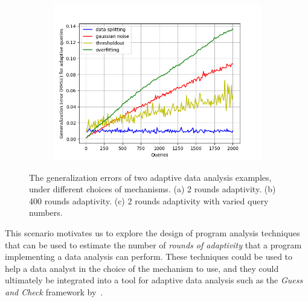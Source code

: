 {\begin{figure}
\begin{subfigure}{.322\textwidth}
\begin{centering}
\caption{}
\end{centering}
\end{subfigure}
\begin{subfigure}{.322\textwidth}
\begin{centering}
\includegraphics[width=1.0\textwidth]{twoRounds-rmse-fourmechs.png}
\caption{}
\end{centering}
\end{subfigure}
\vspace{-0.2cm}
 \caption{
 The generalization errors of two adaptive data analysis examples, under different choices of mechanisms.
 (a)  2 rounds adaptivity. 
 (b)  400 rounds adaptivity.
 (c) 2 rounds adaptivity with varied query numbers.
}
\label{fig:generalization_errors}
\vspace{-0.2cm}
\end{figure}
}

This scenario motivates us to explore the design of program analysis techniques that can be used to estimate the number of \emph{rounds of adaptivity} that a program implementing a data analysis can perform. These techniques could be used to help a data analyst in the choice of the mechanism to use,
and they
could ultimately be integrated into a tool for adaptive data analysis such as the \emph{Guess and Check} framework by~\citet{RogersRSSTW20}. 

